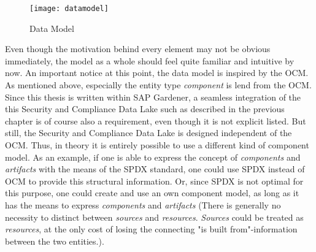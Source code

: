 \begin{figure}[H]
	\centering
	\texttt{[image: datamodel]}
	\caption[Data Model]{Data Model }
	\label{fig:DataModel}
\end{figure} 

Even though the motivation behind every element may not be obvious immediately, the model as a whole should feel quite familiar and intuitive by now. An important notice at this point, the data model is inspired by the OCM. As mentioned above, especially the entity type \emph{component} is lend from the OCM. Since this thesis is written within SAP Gardener, a seamless integration of the this Security and Compliance Data Lake such as described in the previous chapter is of course also a requirement, even though it is not explicit listed. But still, the Security and Compliance Data Lake is designed independent of the OCM. Thus, in theory it is entirely possible to use a different kind of component model. As an example, if one is able to express the concept of \emph{components} and \emph{artifacts} with the means of the SPDX standard, one could use SPDX instead of OCM to provide this structural information. Or, since SPDX is not optimal for this purpose, one could create and use an own component model, as long as it has the means to express \emph{components} and \emph{artifacts} (There is generally no necessity to distinct between \emph{sources} and \emph{resources}. \emph{Sources} could be treated as \emph{resources}, at the only cost of losing the connecting "is built from"-information between the two entities.).

